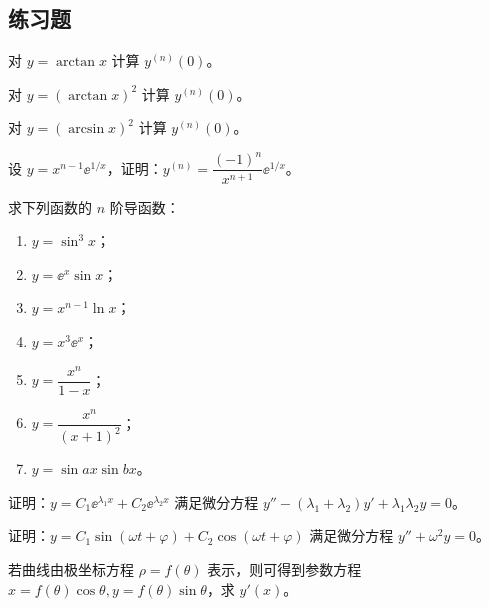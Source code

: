 \subsection{练习题}

\begin{xexercise}[1]
对 $y=\arctan x$ 计算 $y^{(n)}(0)$。
\end{xexercise}

\begin{xexercise}[2]
对 $y=(\arctan x)^2$ 计算 $y^{(n)}(0)$。
\end{xexercise}

\begin{xexercise}[3]
对 $y=(\arcsin x)^2$ 计算 $y^{(n)}(0)$。
\end{xexercise}

\begin{xexercise}[4]
设 $y=x^{n-1}\ee^{1/x}$，证明：$y^{(n)}=\dfrac{(-1)^n}{x^{n+1}}\ee^{1/x}$。
\end{xexercise}

\begin{xexercise}[5]
求下列函数的 $n$ 阶导函数：
  \begin{enumerate}[label=(\arabic*)]
    \item $y=\sin^3x$；
    \item $y=\ee^x\sin x$；
    \item $y=x^{n-1}\ln x$；
    \item $y=x^3\ee^x$；
    \item $y=\dfrac{x^n}{1-x}$；
    \item $y=\dfrac{x^n}{(x+1)^2}$；
    \item $y=\sin ax\sin bx$。
  \end{enumerate}
\end{xexercise}

\begin{xexercise}[6]
证明：$y=C_1\ee^{\lambda_1x}+C_2\ee^{\lambda_2x}$ 满足微分方程 $y''-(\lambda_1+\lambda_2)y'+\lambda_1\lambda_2y=0$。
\end{xexercise}

\begin{xexercise}[7]
证明：$y=C_1\sin(\omega t+\varphi)+C_2\cos(\omega t+\varphi)$ 满足微分方程 $y''+\omega^2y=0$。
\end{xexercise}

\begin{xexercise}[8]
若曲线由极坐标方程 $\rho=f(\theta)$ 表示，则可得到参数方程 $x=f(\theta)\cos\theta,y=f(\theta)\sin\theta$，求 $y'(x)$。
\end{xexercise}

